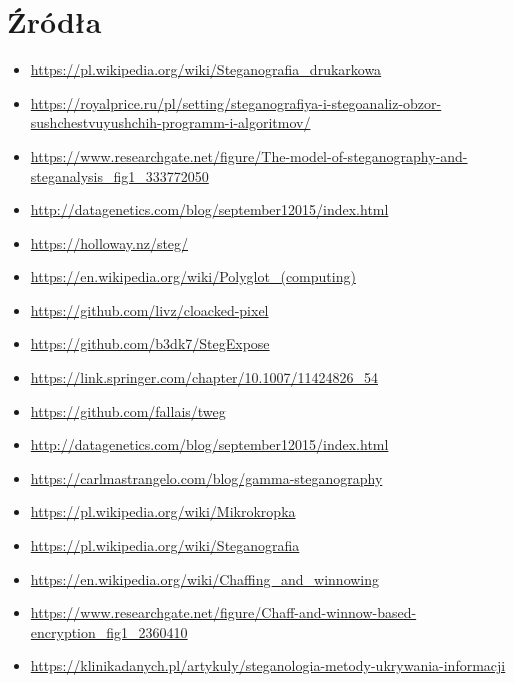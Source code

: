 \documentclass{article}
\begin{document}
\section{Źródła}
\begin{itemize}
	\item \url{https://pl.wikipedia.org/wiki/Steganografia_drukarkowa}
	\item \url{https://royalprice.ru/pl/setting/steganografiya-i-stegoanaliz-obzor-sushchestvuyushchih-programm-i-algoritmov/}
	\item \url{https://www.researchgate.net/figure/The-model-of-steganography-and-steganalysis_fig1_333772050}
	\item \url{http://datagenetics.com/blog/september12015/index.html}
	\item \url{https://holloway.nz/steg/}
	\item \url{https://en.wikipedia.org/wiki/Polyglot_(computing)}
	\item \url{https://github.com/livz/cloacked-pixel}
	\item \url{https://github.com/b3dk7/StegExpose}
	\item \url{https://link.springer.com/chapter/10.1007/11424826_54}
	\item \url{https://github.com/fallais/tweg}
	\item \url{http://datagenetics.com/blog/september12015/index.html}
	\item \url{https://carlmastrangelo.com/blog/gamma-steganography}
	\item \url{https://pl.wikipedia.org/wiki/Mikrokropka}
	\item \url{https://pl.wikipedia.org/wiki/Steganografia}
	\item \url{https://en.wikipedia.org/wiki/Chaffing_and_winnowing}
	\item \url{https://www.researchgate.net/figure/Chaff-and-winnow-based-encryption_fig1_2360410}
	\item \url{https://klinikadanych.pl/artykuly/steganologia-metody-ukrywania-informacji}
\end{itemize}
\end{document}
